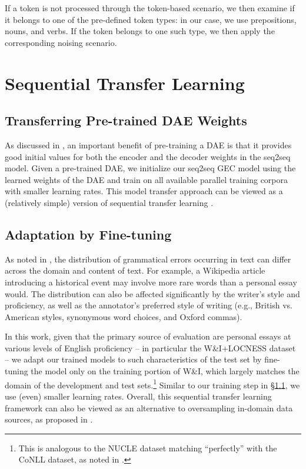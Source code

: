 \documentclass[11pt,a4paper]{article}
\begin{document}
If a token is not processed through the token-based scenario, we then examine if it belongs to one of the pre-defined token types: in our case, we use prepositions, nouns, and verbs. 
If the token belongs to one such type, we then apply the corresponding noising scenario.


\section{Sequential Transfer Learning}\label{sec:transfer}

\subsection{Transferring Pre-trained DAE Weights}\label{sec:train}

As discussed in \cite{zhao2019improving}, an important benefit of pre-training a DAE is that it provides good initial values for both the encoder and the decoder weights in the seq2seq model. 
Given a pre-trained DAE, we initialize our seq2seq GEC model using the learned weights of the DAE and train on all available parallel training corpora with smaller learning rates.
This model transfer approach \cite{wang2015transfer} can be viewed as a (relatively simple) version of sequential transfer learning \cite{ruder2019neural}.

\subsection{Adaptation by Fine-tuning}\label{sec:finetune}


As noted in \cite{junczys2018approaching}, the distribution of grammatical errors occurring in text can differ across the domain and content of text. 
For example, a Wikipedia article introducing a historical event may involve more rare words than a personal essay would. 
The distribution can also be affected significantly by the writer's style and proficiency, as well as the annotator's preferred style of writing (e.g., British vs. American styles, synonymous word choices, and Oxford commas). 

In this work, given that the primary source of evaluation are personal essays at various levels of English proficiency -- in particular the W\&I+LOCNESS dataset \cite{yannakoudakis2018developing} -- we adapt our trained models to such characteristics of the test set by fine-tuning the model only on the training portion of W\&I, which largely matches the domain of the development and test sets.\footnote{This is analogous to the NUCLE dataset matching ``perfectly'' with the CoNLL dataset, as noted in \cite{junczys2018approaching}.}
Similar to our training step in \S\ref{sec:train}, we use (even) smaller learning rates.
Overall, this sequential transfer learning framework can also be viewed as an alternative to oversampling in-domain data sources, as proposed in \cite{junczys2018approaching}.
\end{document}
